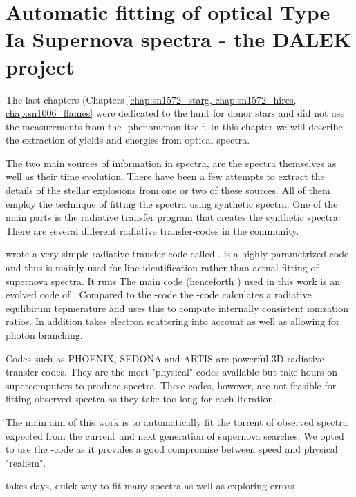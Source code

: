 \chapter{Automatic fitting of optical Type Ia Supernova spectra - the DALEK project}
\label{chap:dalek}

The last chapters (Chapters \ref{chap:sn1572_starg, chap:sn1572_hires, chap:sn1006_flames} were dedicated to the hunt for donor stars and did not use the measurements from the \snia-phenomenon itself. In this chapter we will describe the extraction of yields and energies from optical spectra. 

The two main sources of information in spectra, are the spectra themselves as well as their time evolution. There have been a few attempts to extract the details of the stellar explosions from one or two of these sources. All of them employ the technique of fitting the spectra using synthetic spectra. One of the main parts is the radiative transfer program that creates the synthetic spectra. There are several different radiative transfer-codes in the community. 


\cite{2000PhDT.........6F} wrote a very simple radiative transfer code called \synow. \synow is a highly parametrized code and thus is mainly used for line identification rather than actual fitting of supernova spectra. It runs 
The main code (henceforth \mlc) used in this work is an evolved code of  \cite{1993A&A...279..447M, 2000A&A...363..705M}. Compared to the \synow-code the \mlc-code calculates a radiative equlibirum tepmerature and uses this to compute internally consistent ionization ratios. In addition \mlc takes electron scattering into account as well as allowing for photon branching. 


Codes such as PHOENIX\cite{1999JCoAM.109...41H}, SEDONA \cite{2006ApJ...651..366K} and ARTIS \cite{2009MNRAS.398.1809K} are powerful 3D radiative transfer codes. They are the most "physical" codes available but take hours on supercomputers to produce spectra. These codes, however, are not feasible for fitting observed spectra as they take too long for each iteration. 

The main aim of this work is to automatically fit the torrent of observed spectra expected from the current and next generation of supernova searches. We opted to use the \mlc-code as it provides a good compromise between speed and physical "realism". 

takes days, quick way to fit  many spectra as well as exploring errors 

